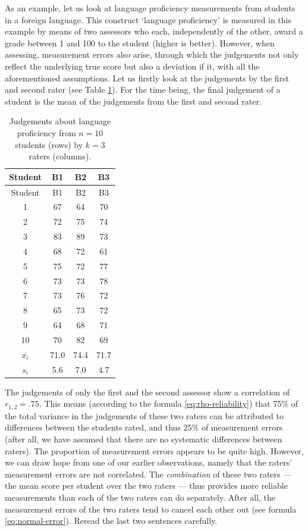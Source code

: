 \documentclass[
]{book}
\begin{document}
As an example, let us look at language proficiency measurements from students
in a foreign language. This construct `language proficiency'
is measured in this example by means of two assessors who each, independently
of the other, award a grade between 1 and 100 to the student (higher is better).
However, when assessing, measurement errors also arise, through which the judgements
not only reflect the underlying true score but also a deviation if it, with
all the aforementioned assumptions. Let us firstly look at the
judgements by the first and second rater (see Table
\ref{tab:reliability}). For the time being, the final judgement of a student is
the mean of the judgements from the first and second rater.

\begin{longtable}[]{@{}cccc@{}}
\caption{\label{tab:reliability} Judgements about language proficiency
from \(n = 10\) students (rows) by \(k = 3\) raters (columns).}\tabularnewline
\toprule
Student & B1 & B2 & B3\tabularnewline
\midrule
\endfirsthead
\toprule
Student & B1 & B2 & B3\tabularnewline
\midrule
\endhead
1 & 67 & 64 & 70\tabularnewline
2 & 72 & 75 & 74\tabularnewline
3 & 83 & 89 & 73\tabularnewline
4 & 68 & 72 & 61\tabularnewline
5 & 75 & 72 & 77\tabularnewline
6 & 73 & 73 & 78\tabularnewline
7 & 73 & 76 & 72\tabularnewline
8 & 65 & 73 & 72\tabularnewline
9 & 64 & 68 & 71\tabularnewline
10 & 70 & 82 & 69\tabularnewline
\(\overline{x_i}\) & 71.0 & 74.4 & 71.7\tabularnewline
\(s_i\) & 5.6 & 7.0 & 4.7\tabularnewline
\bottomrule
\end{longtable}

The judgements of only the first and the second assessor show a
correlation of \(r_{1,2}=.75\). This means (according to the formula
\eqref{eq:rho-reliability}) that 75\% of the total variance in the
judgements of these two raters can be attributed to differences
between the students rated, and thus 25\% of measurement errors (after all,
we have assumed that there are no systematic differences between
raters). The proportion of measurement errors appears to be quite high.
However, we can draw hope from one of our earlier observations, namely that
the raters' measurement errors are not correlated. The
\emph{combination} of these two raters --- the mean score per student
over the two raters --- thus provides more reliable measurements
than each of the two raters can do separately. After all, the
measurement errors of the two raters tend to cancel each other out
(see formula \eqref{eq:normal-error}).
Reread the last two sentences carefully.
\end{document}
